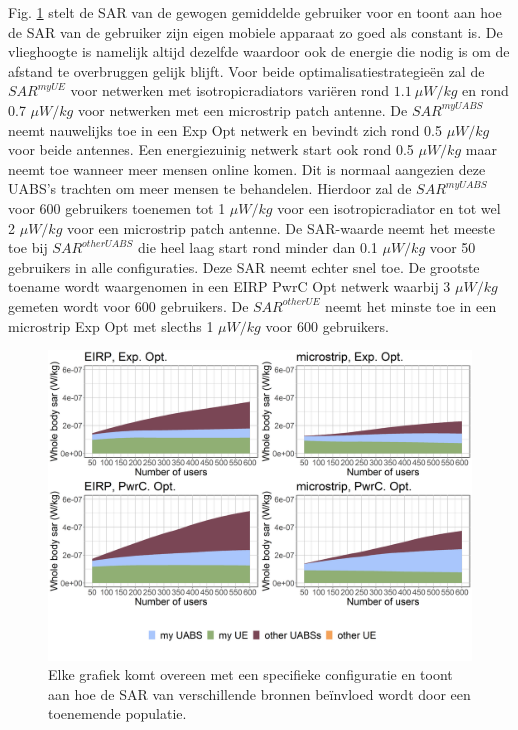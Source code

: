 \documentclass[twocolumn]{phdsymp_dutch}
\begin{document}
Fig. \ref{fig:s3b_fourSourcesMatrix} stelt de  
\gls{SAR} van de gewogen gemiddelde gebruiker voor en toont aan hoe de 
\gls{SAR} van de gebruiker zijn eigen mobiele apparaat zo goed als constant is.
De vlieghoogte is namelijk altijd dezelfde waardoor ook de energie die nodig is om de afstand te overbruggen gelijk blijft.
Voor beide optimalisatiestrategie\"en zal de
 $SAR^{myUE}$ voor netwerken met  \gls{isotropicradiator}s vari\"eren rond $1.1\ \mu W/kg$  %
 en rond 0.7 $\mu W/kg$ voor netwerken met een microstrip patch antenne.
De $SAR^{myUABS}$ neemt nauwelijks toe in een \gls{Exp Opt} netwerk en bevindt zich rond 0.5 $\mu W/kg$ voor beide antennes.
Een energiezuinig netwerk start ook rond
 0.5 $\mu W/kg$ maar neemt toe wanneer meer mensen online komen.
Dit is normaal aangezien deze \gls{UABS}'s trachten om meer mensen te behandelen.
Hierdoor zal de $SAR^{myUABS}$ 
voor 600 gebruikers toenemen tot 1 $\mu W/kg$ voor een \gls{isotropicradiator} en tot wel 2 $\mu W/kg$ voor een microstrip patch antenne.
De \gls{SAR}-waarde neemt het meeste toe bij $SAR^{otherUABS}$ die heel laag start rond minder  dan  
0.1 $\mu W/kg$ voor 50 gebruikers in alle configuraties. 
Deze \gls{SAR} neemt echter snel toe. De grootste toename wordt waargenomen in een 
\gls{EIRP} \gls{PwrC Opt} netwerk 
waarbij 3 $\mu W/kg$ gemeten wordt voor 600 gebruikers. De $SAR^{otherUE}$ neemt het minste toe in een microstrip \gls{Exp Opt} met 
slecths 1 $\mu W/kg$ voor 600 gebruikers.
\begin{figure}[h!]
\centering
  \includegraphics[width=0.9\linewidth]{../results/s3/uFourSources.png}
  \caption{Elke grafiek komt overeen met een specifieke configuratie en toont aan hoe de \acs{SAR} 
  van verschillende bronnen be\"invloed wordt door een toenemende populatie. %
}
  \label{fig:s3b_fourSourcesMatrix}
\end{figure}
\end{document}
